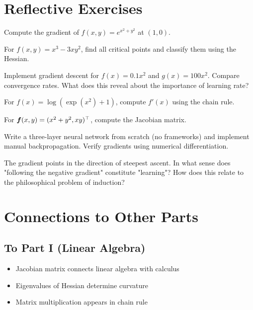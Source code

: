\section{Reflective Exercises}

\begin{exercise}
Compute the gradient of $f(x, y) = e^{x^2 + y^2}$ at $(1, 0)$.
\end{exercise}

\begin{exercise}
For $f(x, y) = x^3 - 3xy^2$, find all critical points and classify them using the Hessian.
\end{exercise}

\begin{exercise}
Implement gradient descent for $f(x) = 0.1x^2$ and $g(x) = 100x^2$. Compare convergence rates. What does this reveal about the importance of learning rate?
\end{exercise}

\begin{exercise}
For $f(x) = \log(\exp(x^2) + 1)$, compute $f'(x)$ using the chain rule.
\end{exercise}

\begin{exercise}
For $\bm{f}(x, y) = (x^2 + y^2, xy)^\top$, compute the Jacobian matrix.
\end{exercise}

\begin{exercise}
Write a three-layer neural network from scratch (no frameworks) and implement manual backpropagation. Verify gradients using numerical differentiation.
\end{exercise}

\begin{exercise}
The gradient points in the direction of steepest ascent. In what sense does "following the negative gradient" constitute "learning"? How does this relate to the philosophical problem of induction?
\end{exercise}

\section{Connections to Other Parts}

\subsection{To Part I (Linear Algebra)}
\begin{itemize}
    \item Jacobian matrix connects linear algebra with calculus
    \item Eigenvalues of Hessian determine curvature
    \item Matrix multiplication appears in chain rule
\end{itemize}

